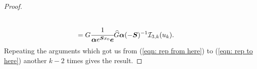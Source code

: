 \begin{proof}
\begin{align}
		\\& =G  \cfrac{1}{\boldsymbol \alpha e^{\boldsymbol{S} x_0 }\boldsymbol e}  \widehat G \boldsymbol \alpha (-\boldsymbol S)^{-1} \mathcal I_{3,k}(u_k).  \label{eqn: rep to here}
	\end{align}
	Repeating the arguments which got us from (\ref{eqn: rep from here}) to (\ref{eqn: rep to here}) another \(k-2\) times gives the result.
\end{proof}


